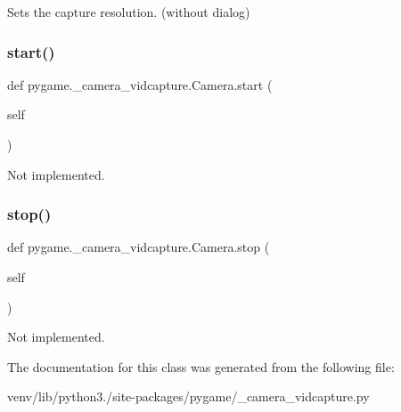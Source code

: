 \begin{DoxyVerb}Sets the capture resolution. (without dialog)
\end{DoxyVerb}
 \mbox{\label{classpygame_1_1__camera__vidcapture_1_1_camera_a00cff0a842797ba4a9a0a90bec899769}} 
\subsubsection{\texorpdfstring{start()}{start()}}
{\footnotesize\ttfamily def pygame.\+\_\+camera\+\_\+vidcapture.\+Camera.\+start (\begin{DoxyParamCaption}\item[{}]{self }\end{DoxyParamCaption})}

\begin{DoxyVerb}Not implemented.
\end{DoxyVerb}
 \mbox{\label{classpygame_1_1__camera__vidcapture_1_1_camera_a9e14f2a8ddfac2f864e54684c71df7f7}} 
\subsubsection{\texorpdfstring{stop()}{stop()}}
{\footnotesize\ttfamily def pygame.\+\_\+camera\+\_\+vidcapture.\+Camera.\+stop (\begin{DoxyParamCaption}\item[{}]{self }\end{DoxyParamCaption})}

\begin{DoxyVerb}Not implemented.
\end{DoxyVerb}
 

The documentation for this class was generated from the following file\+:\begin{DoxyCompactItemize}
\item 
venv/lib/python3./site-\/packages/pygame/\+\_\+camera\+\_\+vidcapture.\+py\end{DoxyCompactItemize}
